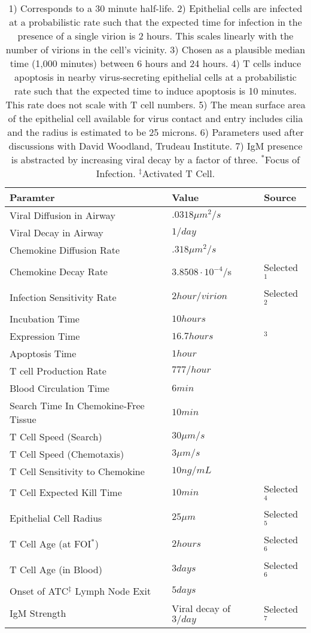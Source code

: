 \documentclass[10pt]{article}
\begin{document}
\begin{table}
\begin{center}
\begin{tabular}{| l l l |}
  \hline                        
  Paramter & Value & Source \\
  \hline
  Viral Diffusion in Airway & $.0318 \mu m^2/s$ & \cite{Beauchemin2006} \\
  Viral Decay in Airway &  $1/day$ & \cite{Lee2009} \\
  Chemokine Diffusion Rate & $.318 \mu m^2/s$ & \cite{Beauchemin2006} \\
  Chemokine Decay Rate &  $3.8508\cdot10^{-4}$/s & Selected$^1$\\
  Infection Sensitivity Rate &  $2 hour/virion$ &  Selected$^2$ \\
  Incubation Time &  $10 hours$ & \cite{Mitchell2011} \\
  Expression Time &  $16.7 hours$ & \cite{Mitchell2011}$^3$ \\
  Apoptosis Time & $1 hour$ & \cite{Ganusov2008} \\
  T cell Production Rate & $777/hour$ & \cite{Miao2010} \\ 
  Blood Circulation Time & $6 min$ & \cite{Banerjee2010b} \\
  Search Time In Chemokine-Free Tissue & $10 min$ & \cite{Banerjee2010b} \\
  T Cell Speed (Search) & $30 \mu m/s$ & \cite{Miller2003} \\
  T Cell Speed (Chemotaxis) & $3 \mu m/s$ & \cite{Miller2003} \\
  T Cell Sensitivity to Chemokine & $10 ng/mL$ & \cite{Gao2003} \\
  T Cell Expected Kill Time & $10 min$ & Selected$^4$ \\
  Epithelial Cell Radius & $25 \mu m$ & Selected$^5$ \\
  T Cell Age (at FOI$^\ast$) & $2 hours$ & Selected$^6$ \\
  T Cell Age (in Blood) & $3 days$ & Selected$^6$ \\
  Onset of ATC$^\ddagger$ Lymph Node Exit & $5 days$ & \cite{Banerjee2011} \\
  IgM Strength & Viral decay of $3/day$ & Selected$^7$ \\
  \hline  
\end{tabular}
\caption{1) Corresponds to a 30 minute half-life.  2) Epithelial cells are infected at a probabilistic rate such that the expected time for infection in the presence of a single virion is 2 hours.  This scales linearly with the number of virions in the cell's vicinity.  3) Chosen as a plausible median time (1,000 minutes) between 6 hours and 24 hours.  4) T cells induce apoptosis in nearby virus-secreting epithelial cells at a probabilistic rate such that the expected time to induce apoptosis is 10 minutes.  This rate does not scale with T cell numbers.  5)  The mean surface area of the epithelial cell available for virus contact and entry includes cilia and the radius is estimated to be 25 microns. 6) Parameters used after discussions with David Woodland, Trudeau Institute.  7) IgM presence is abstracted by increasing viral decay by a factor of three. $^\ast$Focus of Infection.  $^\ddagger$Activated T Cell.}

\end{center}
\end{table}
\end{document}
